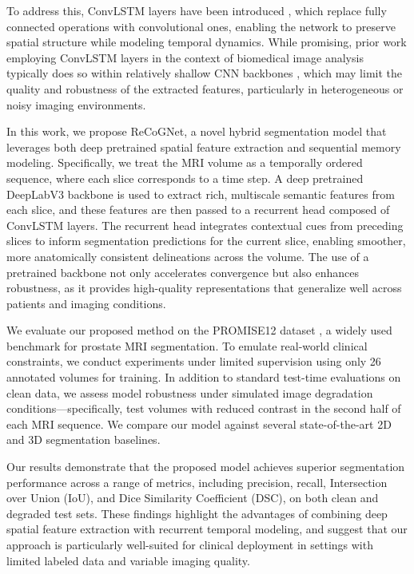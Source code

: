 \documentclass[journal]{IEEEtran}
\begin{document}
To address this, ConvLSTM layers have been introduced \cite{shi2015convolutional}, which replace fully connected operations with convolutional ones, enabling the network to preserve spatial structure while modeling temporal dynamics. While promising, prior work employing ConvLSTM layers in the context of biomedical image analysis typically does so within relatively shallow CNN backbones \cite{almiahi2024novel}, which may limit the quality and robustness of the extracted features, particularly in heterogeneous or noisy imaging environments.

In this work, we propose ReCoGNet, a novel hybrid segmentation model that leverages both deep pretrained spatial feature extraction and sequential memory modeling. Specifically, we treat the MRI volume as a temporally ordered sequence, where each slice corresponds to a time step. A deep pretrained DeepLabV3 backbone \cite{chen2017rethinking} is used to extract rich, multiscale semantic features from each slice, and these features are then passed to a recurrent head composed of ConvLSTM layers. The recurrent head integrates contextual cues from preceding slices to inform segmentation predictions for the current slice, enabling smoother, more anatomically consistent delineations across the volume. The use of a pretrained backbone not only accelerates convergence but also enhances robustness, as it provides high-quality representations that generalize well across patients and imaging conditions.

We evaluate our proposed method on the PROMISE12 dataset \cite{litjens2014evaluation}, a widely used benchmark for prostate MRI segmentation. To emulate real-world clinical constraints, we conduct experiments under limited supervision using only 26 annotated volumes for training. In addition to standard test-time evaluations on clean data, we assess model robustness under simulated image degradation conditions—specifically, test volumes with reduced contrast in the second half of each MRI sequence. We compare our model against several state-of-the-art 2D and 3D segmentation baselines.

Our results demonstrate that the proposed model achieves superior segmentation performance across a range of metrics, including precision, recall, Intersection over Union (IoU), and Dice Similarity Coefficient (DSC), on both clean and degraded test sets. These findings highlight the advantages of combining deep spatial feature extraction with recurrent temporal modeling, and suggest that our approach is particularly well-suited for clinical deployment in settings with limited labeled data and variable imaging quality.
\end{document}
